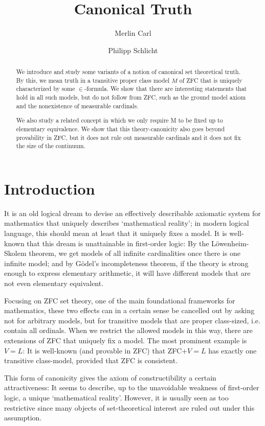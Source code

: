 \documentclass[a4paper,12pt]{amsart}
\title{Canonical Truth}
\author{Merlin Carl}
\author{Philipp Schlicht}
\theoremstyle{definition}
\begin{document}
\maketitle


\begin{abstract}
We introduce and study some variants of a notion of canonical set theoretical truth. By this, we mean truth in a transitive proper class model $M$ of ZFC that is uniquely characterized by some $\in$-formula. We show that there are interesting statements that hold in all such models, but do not follow from ZFC, such as the ground model axiom and the nonexistence of measurable cardinals. 

We also study a related concept in which we only require M to be fixed up to elementary equivalence. We show that this theory-canonicity also goes beyond provability in ZFC, but it does not rule out measurable cardinals and it does not fix the size of the continuum.
\end{abstract}

\section{Introduction}

It is an old logical dream to devise an effectively describable axiomatic system for mathematics that uniquely describes `mathematical reality'; in modern logical language, this should mean
at least that it uniquely fixes a model.
It is well-known that this dream is unattainable in first-order logic: By the L\"owenheim-Skolem theorem, we get models of all infinite cardinalities once there is
one infinite model; and by G\"odel's incompleteness theorem, if the theory is strong enough to express elementary arithmetic, it will have different models that are not even elementary equivalent.

Focusing on ZFC set theory, one of the main foundational frameworks for mathematics, these two effects can in a certain sense be cancelled out by asking not for arbitrary models, but for
transitive models that are proper class-sized, i.e. contain all ordinals. When we restrict the allowed models in this way, there are extensions of ZFC that uniquely fix a model.
The most prominent example is $V=L$: It is well-known (and provable in ZFC) that ZFC+$V=L$ has exactly one transitive class-model, provided that ZFC is consistent.

This form of canonicity gives the axiom of constructibility a certain attractiveness: It seems to describe, up to the unavoidable weakness of first-order logic, a unique `mathematical reality'. However, 
it is usually seen as too restrictive since many objects of set-theoretical interest are ruled out under this assumption.
\end{document}
